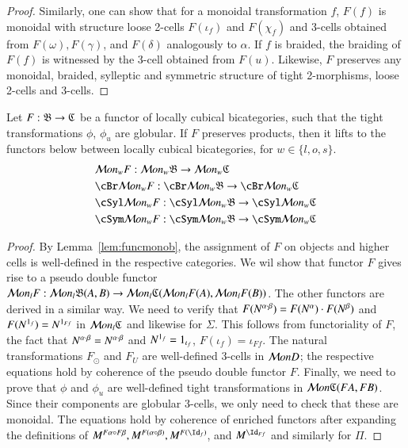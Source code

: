 \begin{proof}

Similarly, one can show that for a monoidal transformation $f$, $F(f)$ is monoidal with structure loose 2-cells $F(\iota_f)$ and $F(\chi_f)$ and 3-cells obtained from $F(\omega),  F(\gamma)$, and $F(\delta)$ analogously to $\alpha$. If $f$ is braided, the braiding of $F(f)$ is witnessed by the 3-cell obtained from $F(u)$. Likewise, $F$ preserves any monoidal, braided, sylleptic and symmetric structure of tight 2-morphisms, loose 2-cells and 3-cells. 
 \end{proof}

\begin{thm}\label{thm:lcbcfunctor}
Let $F: \mathfrak{B}  \rightarrow \mathfrak{C}$ be a functor of locally cubical bicategories, such that the tight transformations $\phi$, $\phi_u$ are globular. If $F$ preserves products, then it lifts to the functors below between locally cubical bicategories, for $w \in \{l,o,s\}$.
\begin{align*}
&\cM on_wF: \cM on_w \fB  \rightarrow \cM on_w\fC\\ 
&\cBr \cM on_wF: \cBr \cM on_w \fB  \rightarrow \cBr \cM on_w\fC\\
& \cSyl \cM on_wF: \cSyl \cM on_w \fB  \rightarrow \cSyl \cM on_w\fC\\
&\cSym \cM on_wF: \cSym \cM on_w \fB  \rightarrow \cSym \cM on_w\fC
\end{align*}
\end{thm}

\begin{proof}
By Lemma~\ref{lem:funcmonob}, the assignment of $F$ on objects and higher cells is well-defined in the respective categories.
We wil show that functor $F$ gives rise to a pseudo double functor $\mathcal{M} on_lF: \mathcal{M} on_l \mathfrak{B}(A, B)  \rightarrow \mathcal{M} on_l\mathfrak{C}(\mathcal{M} on_lF(A), \mathcal{M} on_lF(B))$. The other functors are derived in a similar way. We need to verify that $F(N^{\alpha \cdot \beta}) = F(N^{\alpha}) \cdot F(N^{\beta})$ and $F(N^{1_f}) = N^{1_{Ff}}$ in $\mathcal{M} on_l\mathfrak{C}$ and likewise for $\Sigma$. This follows from functoriality of $F$, the fact that $N^{\alpha \cdot \beta} = N^{\alpha \cdot \beta}$ and $N^{1_f} = 1_{\iota_f}$, $F(\iota_f) = \iota_{Ff}$.
The natural transformations $F_{\odot}$ and $F_U$ are well-defined 3-cells in $\mathcal{M} onD$; the respective equations hold by coherence of the pseudo double functor $F$.
Finally, we need to prove that $\phi$ and $\phi_u$ are well-defined tight transformations in $\mathcal{M} on \mathfrak{C}(F A, F B)$. Since their components are globular 3-cells, we only need to check that these are monoidal. The equations hold by coherence of enriched functors after expanding the definitions of $M^{F\alpha \comp F \beta}, M^{F(\alpha \comp \beta)}, M^{F(\looseid_f)}$, and $M^{\looseid_{F f}}$ and similarly for $\Pi$.
\end{proof}

